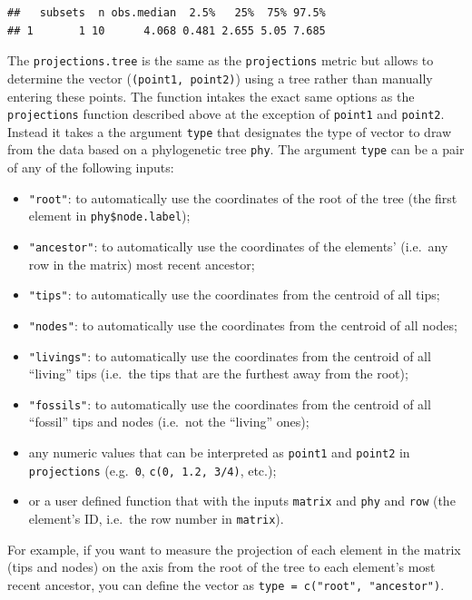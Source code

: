 \documentclass[
]{book}
\providecommand{\tightlist}{%
  \setlength{\itemsep}{0pt}\setlength{\parskip}{0pt}}
\begin{document}
\begin{verbatim}
##   subsets  n obs.median  2.5%   25%  75% 97.5%
## 1       1 10      4.068 0.481 2.655 5.05 7.685
\end{verbatim}

The \texttt{projections.tree} is the same as the \texttt{projections} metric but allows to determine the vector (\texttt{(point1,\ point2)}) using a tree rather than manually entering these points.
The function intakes the exact same options as the \texttt{projections} function described above at the exception of \texttt{point1} and \texttt{point2}.
Instead it takes a the argument \texttt{type} that designates the type of vector to draw from the data based on a phylogenetic tree \texttt{phy}.
The argument \texttt{type} can be a pair of any of the following inputs:

\begin{itemize}
\tightlist
\item
  \texttt{"root"}: to automatically use the coordinates of the root of the tree (the first element in \texttt{phy\$node.label});
\item
  \texttt{"ancestor"}: to automatically use the coordinates of the elements' (i.e.~any row in the matrix) most recent ancestor;
\item
  \texttt{"tips"}: to automatically use the coordinates from the centroid of all tips;
\item
  \texttt{"nodes"}: to automatically use the coordinates from the centroid of all nodes;
\item
  \texttt{"livings"}: to automatically use the coordinates from the centroid of all ``living'' tips (i.e.~the tips that are the furthest away from the root);
\item
  \texttt{"fossils"}: to automatically use the coordinates from the centroid of all ``fossil'' tips and nodes (i.e.~not the ``living'' ones);
\item
  any numeric values that can be interpreted as \texttt{point1} and \texttt{point2} in \texttt{projections} (e.g.~\texttt{0}, \texttt{c(0,\ 1.2,\ 3/4)}, etc.);
\item
  or a user defined function that with the inputs \texttt{matrix} and \texttt{phy} and \texttt{row} (the element's ID, i.e.~the row number in \texttt{matrix}).
\end{itemize}

For example, if you want to measure the projection of each element in the matrix (tips and nodes) on the axis from the root of the tree to each element's most recent ancestor, you can define the vector as \texttt{type\ =\ c("root",\ "ancestor")}.
\end{document}
